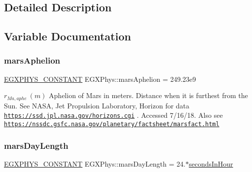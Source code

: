 \subsection{Detailed Description}


\subsection{Variable Documentation}
\mbox{\label{group___e_g_x_phys-_constants-_astrophysics-_solar_system-_mars-_orbit_gae6037c164e2d8b5822661474e3143d27}} 
\subsubsection{\texorpdfstring{mars\+Aphelion}{marsAphelion}}
{\footnotesize\ttfamily \mbox{\hyperlink{group___e_g_x_phys-_constants-_macros_ga76980d288494ce1714c9ac68a95ba702}{E\+G\+X\+P\+H\+Y\+S\+\_\+\+C\+O\+N\+S\+T\+A\+NT}} E\+G\+X\+Phys\+::mars\+Aphelion = 249.\+23e9}

$ r_{Ma,aphe} \ (m)$ Aphelion of Mars in meters. Distance when it is furthest from the Sun. See N\+A\+SA, Jet Propulsion Laboratory, Horizon for data \href{https://ssd.jpl.nasa.gov/horizons.cgi}{\tt https\+://ssd.\+jpl.\+nasa.\+gov/horizons.\+cgi} . Accessed 7/16/18. Also see \href{https://nssdc.gsfc.nasa.gov/planetary/factsheet/marsfact.html}{\tt https\+://nssdc.\+gsfc.\+nasa.\+gov/planetary/factsheet/marsfact.\+html} \mbox{\label{group___e_g_x_phys-_constants-_astrophysics-_solar_system-_mars-_orbit_ga1cd728f9f836d5ae4a4ffe7dcc2ff6fe}} 
\subsubsection{\texorpdfstring{mars\+Day\+Length}{marsDayLength}}
{\footnotesize\ttfamily \mbox{\hyperlink{group___e_g_x_phys-_constants-_macros_ga76980d288494ce1714c9ac68a95ba702}{E\+G\+X\+P\+H\+Y\+S\+\_\+\+C\+O\+N\+S\+T\+A\+NT}} E\+G\+X\+Phys\+::mars\+Day\+Length = 24.$\ast$\mbox{\hyperlink{namespace_e_g_x_phys_a7c3165cd93e36f1fb8e9fef80f117bef}{seconds\+In\+Hour}}}

